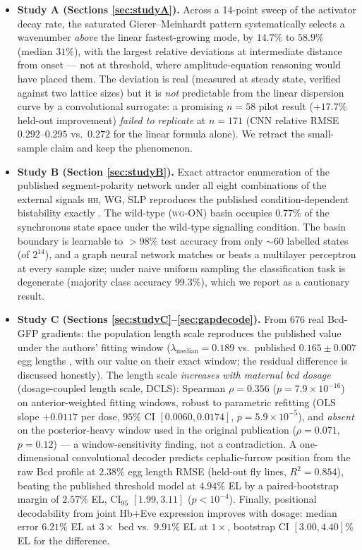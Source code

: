 \begin{itemize}
\item \textbf{Study A (Sections \ref{sec:studyA}).} Across a 14-point sweep
of the activator decay rate, the saturated Gierer--Meinhardt pattern
systematically selects a wavenumber \emph{above} the linear fastest-growing
mode, by $14.7\%$ to $58.9\%$ (median $31\%$), with the largest relative
deviations at intermediate distance from onset --- not at threshold, where
amplitude-equation reasoning would have placed them. The deviation is real
(measured at steady state, verified against two lattice sizes) but it is
\emph{not} predictable from the linear dispersion curve by a convolutional
surrogate: a promising $n = 58$ pilot result ($+17.7\%$ held-out improvement)
\emph{failed to replicate} at $n = 171$ (CNN relative RMSE $0.292$--$0.295$
vs.\ $0.272$ for the linear formula alone). We retract the small-sample claim
and keep the phenomenon.
\item \textbf{Study B (Section \ref{sec:studyB}).} Exact attractor
enumeration of the published segment-polarity network under all eight
combinations of the external signals \textsc{hh}, \textsc{WG}, \textsc{SLP}
reproduces the published condition-dependent bistability exactly
\cite{albert2003}. The wild-type (\textsc{wg}-ON) basin occupies $0.77\%$ of
the synchronous state space under the wild-type signalling condition. The
basin boundary is learnable to $> 98\%$ test accuracy from only $\sim 60$
labelled states (of $2^{14}$), and a graph neural network matches or beats a
multilayer perceptron at every sample size; under naive uniform sampling the
classification task is degenerate (majority class accuracy $99.3\%$), which
we report as a cautionary result.
\item \textbf{Study C (Sections \ref{sec:studyC}--\ref{sec:gapdecode}).}
From 676 real Bcd-GFP gradients: the population length scale reproduces the
published value under the authors' fitting window ($\lambda_{\mathrm{median}}
= 0.189$ vs.\ published $0.165 \pm 0.007$ egg lengths \cite{liu2013}, with
our value on their exact window; the residual difference is discussed
honestly). The length scale \emph{increases with maternal bcd dosage}
(dosage-coupled length scale, DCLS): Spearman $\rho = 0.356$
($p = 7.9 \times 10^{-16}$) on anterior-weighted fitting windows, robust to
parametric refitting (OLS slope $+0.0117$ per dose, $95\%$ CI
$[0.0060, 0.0174]$, $p = 5.9 \times 10^{-5}$), and \emph{absent} on the
posterior-heavy window used in the original publication ($\rho = 0.071$,
$p = 0.12$) --- a window-sensitivity finding, not a contradiction. A
one-dimensional convolutional decoder predicts cephalic-furrow position from
the raw Bcd profile at $2.38\%$ egg length RMSE (held-out fly lines,
$R^2 = 0.854$), beating the published threshold model at $4.94\%$ EL by a
paired-bootstrap margin of $2.57\%$ EL, CI$_{95}$ $[1.99, 3.11]$
($p < 10^{-4}$). Finally, positional decodability from joint Hb+Eve
expression improves with dosage: median error $6.21\%$ EL at $3\times$ bcd
vs.\ $9.91\%$ EL at $1\times$, bootstrap CI $[3.00, 4.40]\%$ EL for the
difference.
\end{itemize}

